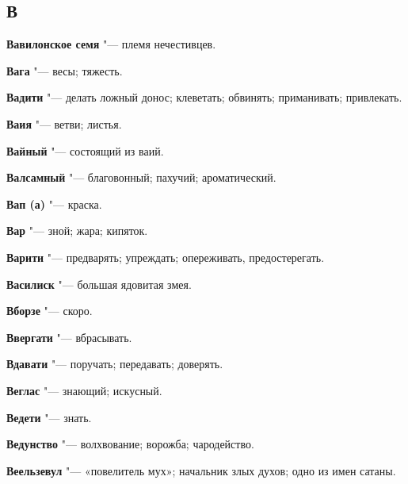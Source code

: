 \begin{mymulticols}{2}
\section{В} 





\noindent\textbf{Вавилонское семя} "--- племя нечестивцев. 




\noindent\textbf{Вага} "--- весы; тяжесть. 




\noindent\textbf{Вадити} "--- делать ложный донос; клеветать; обвинять; приманивать; привлекать. 




\noindent\textbf{Ваия} "--- ветви; листья. 




\noindent\textbf{Вайный} "--- состоящий из ваий. 




\noindent\textbf{Валсамный} "--- благовонный; пахучий; ароматический. 




\noindent\textbf{Вап (а)} "--- краска. 




\noindent\textbf{Вар} "--- зной; жара; кипяток. 




\noindent\textbf{Варити} "--- предварять; упреждать; опереживать, предостерегать. 




\noindent\textbf{Василиск} "--- большая ядовитая змея. 




\noindent\textbf{Вборзе} "--- скоро. 




\noindent\textbf{Ввергати} "--- вбрасывать. 




\noindent\textbf{Вдавати} "--- поручать; передавать; доверять. 




\noindent\textbf{Веглас} "--- знающий; искусный. 




\noindent\textbf{Ведети} "--- знать. 




\noindent\textbf{Ведунство} "--- волхвование; ворожба; чародейство. 




\noindent\textbf{Веельзевул} "--- «повелитель мух»; начальник злых духов; одно из имен сатаны. 





\end{mymulticols}
